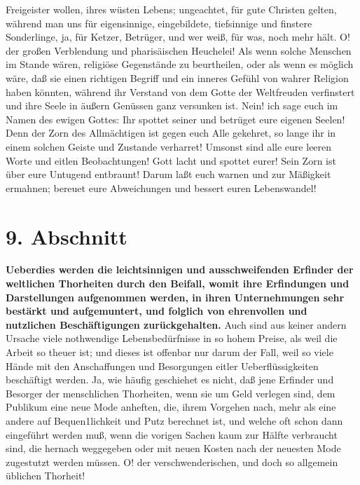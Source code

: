 {Freigeister wollen, ihres wüsten Lebens;
ungeachtet, für gute Christen gelten,
während man uns für eigensinnige, eingebildete, tiefsinnige und finstere
Sonderlinge, ja, für Ketzer, Betrüger, und wer weiß, für
was, noch mehr hält. O!
der großen Verblendung und pharisäischen Heuchelei! Als wenn solche Menschen im
Stande wären, religiöse Gegenstände zu beurtheilen, oder als wenn es möglich
wäre, daß sie einen richtigen Begriff und ein inneres Gefühl von wahrer Religion
haben könnten, während ihr Verstand von dem Gotte der Weltfreuden verfinstert
und ihre Seele in äußern Genüssen ganz versunken ist. Nein! ich sage euch im
Namen des ewigen Gottes: Ihr spottet seiner und betrüget eure eigenen Seelen!
Denn der Zorn des Allmächtigen ist gegen euch Alle gekehret, so lange ihr in
einem solchen Geiste und Zustande verharret! Umsonst sind alle eure leeren Worte
und eitlen Beobachtungen! Gott lacht und spottet eurer! Sein Zorn ist über eure
Untugend entbraunt! Darum laßt euch warnen und zur Mäßigkeit ermahnen; bereuet
eure Abweichungen und bessert euren Lebenswandel!

\section{9. Abschnitt} \label{kap17_ab9}

\textbf{Ueberdies werden die leichtsinnigen und
ausschweifenden Erfinder der weltlichen
Thorheiten durch den Beifall, womit ihre Erfindungen und Darstellungen
aufgenommen werden, in ihren Unternehmungen sehr bestärkt und aufgemuntert, und
folglich von ehrenvollen und nutzlichen Beschäftigungen zurückgehalten.} Auch
sind aus keiner andern Ursache viele nothwendige Lebensbedürfnisse in so hohem
Preise, als weil die Arbeit so theuer ist; und dieses ist offenbar nur darum der
Fall, weil so viele Hände mit den Anschaffungen und Besorgungen eitler
Ueberflüssigkeiten beschäftigt werden. Ja, wie häufig geschiehet es nicht, daß
jene Erfinder und Besorger der menschlichen Thorheiten, wenn sie um Geld
verlegen sind, dem Publikum eine neue Mode anheften, die, ihrem Vorgehen nach,
mehr als eine andere auf Bequen1lichkeit und Putz berechnet ist, und welche oft
schon dann eingeführt werden muß, wenn die vorigen Sachen kaum zur Hälfte
verbraucht sind, die hernach weggegeben oder mit neuen Kosten nach der neuesten
Mode zugestutzt werden müssen. O! der verschwenderischen, und doch so allgemein
üblichen Thorheit!

}
